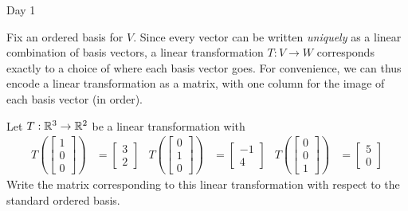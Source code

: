 \begin{applicationActivities}{Day 1}
\begin{observation}
Fix an ordered basis for $V$.  Since every vector can be written \textit{uniquely} as a linear combination of basis vectors, a linear transformation $T:V \rightarrow W$ corresponds exactly to a choice of where each basis vector goes.  For convenience, we can thus encode a linear transformation as a matrix, with one column for the image of each basis vector (in order).
\end{observation}

\begin{activity}{0}
Let $T: \mathbb{R}^3 \rightarrow \mathbb{R}^2$ be a linear transformation with
\begin{align*}
T\left(\begin{bmatrix} 1 \\ 0 \\ 0 \end{bmatrix} \right) &= \begin{bmatrix} 3 \\ 2\end{bmatrix} &
T\left(\begin{bmatrix} 0 \\ 1 \\ 0 \end{bmatrix} \right) &= \begin{bmatrix} -1 \\ 4\end{bmatrix} &
T\left(\begin{bmatrix} 0 \\ 0 \\ 1 \end{bmatrix} \right) &= \begin{bmatrix} 5 \\ 0\end{bmatrix}
\end{align*}
Write the matrix corresponding to this linear transformation with respect to the standard ordered basis.
\end{activity}


\end{applicationActivities}
